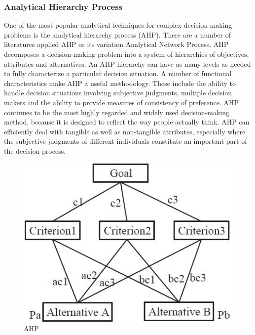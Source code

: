 \subsubsection{Analytical Hierarchy Process}
One of the most popular analytical techniques for
complex decision-making problems is the analytical hierarchy process (AHP)\cite{MCDM}.
There are a number of literatures \cite{SMICloud, GodseAndMulik2009, Karim:2013:EQM:2552868.2552917, 10.1007/978-3-642-25194-8_42, nizamani2012quality} applied AHP or its variation Analytical Network Process.
AHP \cite{SAATY19909} decomposes a decision-making problem into a system of hierarchies of objectives, attributes and alternatives. An AHP hierarchy can have as many levels as needed to fully characterize a particular decision situation. A number of functional characteristics make AHP a useful methodology. These include the ability to handle decision situations involving subjective judgments, multiple decision makers and the ability to provide measures of consistency of preference.
AHP continues to be the most highly regarded and widely used decision-making method, because it is designed to reflect the way people actually think. AHP can efficiently deal with tangible as well as non-tangible attributes, especially where the subjective judgments of different individuals constitute an important part of the decision process.

\begin{figure}[ht]
  \includegraphics[width=\textwidth]{Figures/background/AHP.jpg}
  \caption{AHP \cite{SUN2014134}}
  \label{fig:AHP}
\end{figure}

